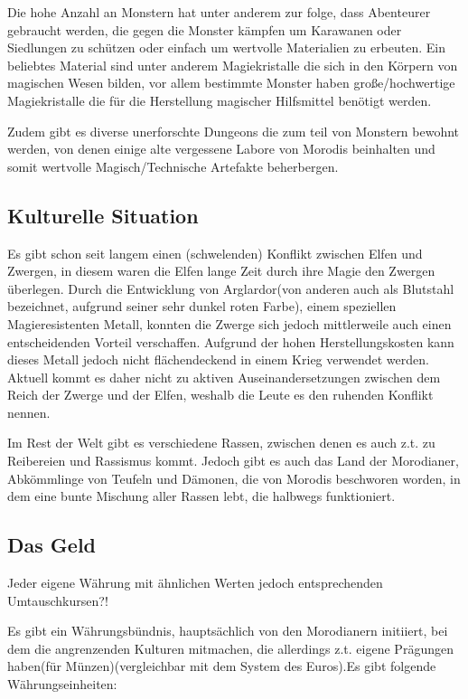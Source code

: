 Die hohe Anzahl an Monstern hat unter anderem zur folge, dass Abenteurer gebraucht werden, die gegen die Monster kämpfen um Karawanen oder Siedlungen zu schützen oder einfach um wertvolle Materialien zu erbeuten.
Ein beliebtes Material sind unter anderem Magiekristalle die sich in den Körpern von magischen Wesen bilden, vor allem bestimmte Monster haben große/hochwertige Magiekristalle die für die Herstellung magischer Hilfsmittel benötigt werden.

Zudem gibt es diverse unerforschte Dungeons die zum teil von Monstern bewohnt werden, von denen einige alte vergessene Labore von Morodis beinhalten und somit wertvolle Magisch/Technische Artefakte beherbergen.

\subsection{Kulturelle Situation}
Es gibt schon seit langem einen (schwelenden) Konflikt zwischen Elfen und Zwergen, in diesem waren die Elfen lange Zeit durch ihre Magie den Zwergen überlegen. Durch die Entwicklung von Arglardor(von anderen auch als Blutstahl bezeichnet, aufgrund seiner sehr dunkel roten Farbe), einem speziellen Magieresistenten Metall, konnten die Zwerge sich jedoch mittlerweile auch einen entscheidenden Vorteil verschaffen. Aufgrund der hohen Herstellungskosten kann dieses Metall jedoch nicht flächendeckend in einem Krieg verwendet werden. Aktuell kommt es daher nicht zu aktiven Auseinandersetzungen zwischen dem Reich der Zwerge und der Elfen, weshalb die Leute es den ruhenden Konflikt nennen.

Im Rest der Welt gibt es verschiedene Rassen, zwischen denen es auch z.t. zu Reibereien und Rassismus kommt. Jedoch gibt es auch das Land der Morodianer, Abkömmlinge von Teufeln und Dämonen, die von Morodis beschworen worden, in dem eine bunte Mischung aller Rassen lebt, die halbwegs funktioniert.

\subsection{Das Geld}
\begin{TODO}
Jeder eigene Währung mit ähnlichen Werten jedoch entsprechenden Umtauschkursen?!
\end{TODO}
Es gibt ein Währungsbündnis, hauptsächlich von den Morodianern initiiert, bei dem die angrenzenden Kulturen mitmachen, die allerdings z.t. eigene Prägungen haben(für Münzen)(vergleichbar mit dem System des Euros).Es gibt folgende Währungseinheiten:

